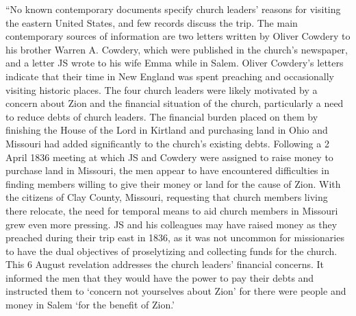 			``No known contemporary documents specify church leaders' reasons for visiting the eastern United States, and few records discuss the trip. The main contemporary sources of information are two letters written by Oliver Cowdery to his brother Warren A. Cowdery, which were published in the church's newspaper, and a letter JS wrote to his wife Emma while in Salem. Oliver Cowdery's letters indicate that their time in New England was spent preaching and occasionally visiting historic places. The four church leaders were likely motivated by a concern about Zion and the financial situation of the church, particularly a need to reduce debts of church leaders. The financial burden placed on them by finishing the House of the Lord in Kirtland and purchasing land in Ohio and Missouri had added significantly to the church's existing debts. Following a 2 April 1836 meeting at which JS and Cowdery were assigned to raise money to purchase land in Missouri, the men appear to have encountered difficulties in finding members willing to give their money or land for the cause of Zion. With the citizens of Clay County, Missouri, requesting that church members living there relocate, the need for temporal means to aid church members in Missouri grew even more pressing. JS and his colleagues may have raised money as they preached during their trip east in 1836, as it was not uncommon for missionaries to have the dual objectives of proselytizing and collecting funds for the church. This 6 August revelation addresses the church leaders' financial concerns. It informed the men that they would have the power to pay their debts and instructed them to `concern not yourselves about Zion' for there were people and money in Salem `for the benefit of Zion.'

